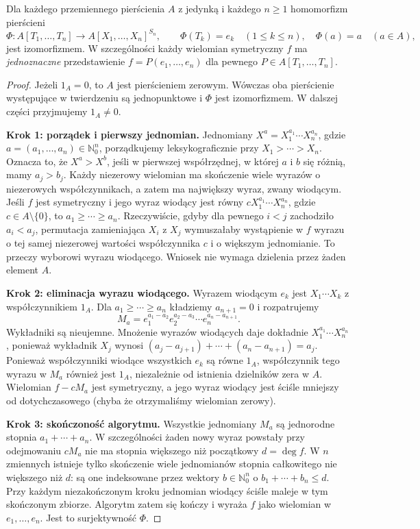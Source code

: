 \begin{twierdzenie}\label{aa:tw:fundamental-symmetric}
Dla każdego przemiennego pierścienia $A$ z jedynką
i każdego $n\ge1$ homomorfizm pierścieni
\[
 \Phi:A[T_1,\ldots,T_n]\longrightarrow
 A[X_1,\ldots,X_n]^{S_n},\qquad
 \Phi(T_k)=e_k\quad(1\le k\le n),\quad\Phi(a)=a\quad(a\in A),
\]
jest izomorfizmem. W szczególności każdy wielomian symetryczny
$f$ ma \emph{jednoznaczne} przedstawienie
$f=P(e_1,\ldots,e_n)$ dla pewnego
$P\in A[T_1,\ldots,T_n]$.
\end{twierdzenie}

\begin{proof}
Jeżeli $1_A=0$, to $A$ jest pierścieniem zerowym.
Wówczas oba pierścienie występujące w twierdzeniu
są jednopunktowe i $\Phi$ jest izomorfizmem.
W dalszej części przyjmujemy $1_A\ne0$.

\textbf{Krok 1: porządek i pierwszy jednomian.}
Jednomiany $X^a=X_1^{a_1}\cdots X_n^{a_n}$, gdzie
$a=(a_1,\ldots,a_n)\in\mathbb N_0^n$, porządkujemy
leksykograficznie przy $X_1>\cdots>X_n$.
Oznacza to, że $X^a>X^b$, jeśli w pierwszej współrzędnej,
w której $a$ i $b$ się różnią, mamy $a_j>b_j$.
Każdy niezerowy wielomian ma skończenie wiele wyrazów
o niezerowych współczynnikach, a zatem ma największy wyraz,
zwany wiodącym. Jeśli $f$ jest symetryczny i jego wyraz
wiodący jest równy $cX_1^{a_1}\cdots X_n^{a_n}$, gdzie
$c\in A\setminus\{0\}$, to $a_1\ge\cdots\ge a_n$.
Rzeczywiście, gdyby dla pewnego $i<j$ zachodziło $a_i<a_j$,
permutacja zamieniająca $X_i$ z $X_j$ wymuszałaby wystąpienie
w $f$ wyrazu o tej samej niezerowej wartości współczynnika
$c$ i o większym jednomianie. To przeczy wyborowi wyrazu
wiodącego. Wniosek nie wymaga dzielenia przez żaden element $A$.

\textbf{Krok 2: eliminacja wyrazu wiodącego.}
Wyrazem wiodącym $e_k$ jest $X_1\cdots X_k$ z
współczynnikiem $1_A$. Dla $a_1\ge\cdots\ge a_n$ kładziemy
$a_{n+1}=0$ i rozpatrujemy
\[
 M_a=e_1^{a_1-a_2}e_2^{a_2-a_3}\cdots e_n^{a_n-a_{n+1}}.
\]
Wykładniki są nieujemne. Mnożenie wyrazów wiodących
daje dokładnie $X_1^{a_1}\cdots X_n^{a_n}$, ponieważ
wykładnik $X_j$ wynosi
$(a_j-a_{j+1})+\cdots+(a_n-a_{n+1})=a_j$.
Ponieważ współczynniki wiodące wszystkich $e_k$ są
równe $1_A$, współczynnik tego wyrazu w $M_a$ również
jest $1_A$, niezależnie od istnienia dzielników zera w $A$.
Wielomian $f-cM_a$ jest symetryczny, a jego wyraz wiodący
jest ściśle mniejszy od dotychczasowego (chyba że otrzymaliśmy
wielomian zerowy).

\textbf{Krok 3: skończoność algorytmu.}
Wszystkie jednomiany $M_a$ są jednorodne stopnia
$a_1+\cdots+a_n$. W szczególności żaden nowy wyraz
powstały przy odejmowaniu $cM_a$ nie ma stopnia
większego niż początkowy $d=\deg f$.
W $n$ zmiennych istnieje tylko skończenie wiele jednomianów
stopnia całkowitego nie większego niż $d$: są one
indeksowane przez wektory $b\in\mathbb N_0^n$ o
$b_1+\cdots+b_n\le d$. Przy każdym niezakończonym
kroku jednomian wiodący ściśle maleje w tym skończonym
zbiorze. Algorytm zatem się kończy i wyraża $f$ jako
wielomian w $e_1,\ldots,e_n$. Jest to surjektywność $\Phi$.


\end{proof}
